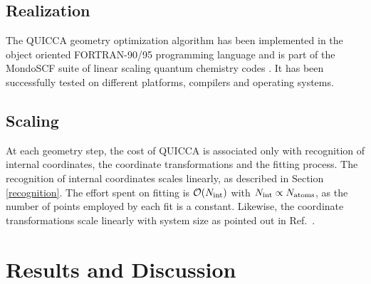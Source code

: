 \documentclass[prl,twocolumn,showpacs,twocolumngrid,superbib]{revtex4}
\begin{document}
\subsection{Realization}

The QUICCA geometry optimization algorithm has been implemented in the
object oriented FORTRAN-90/95 programming language and is part of
the MondoSCF suite of linear scaling quantum chemistry codes \cite{MondoSCF}.
It has been successfully tested on different platforms, compilers and operating
systems. 

\subsection{Scaling}

At each geometry step, the cost of QUICCA is associated only with 
recognition of internal coordinates, the coordinate 
transformations and the fitting process. The recognition of internal 
coordinates scales linearly, as described in Section \ref{recognition}.  
The effort spent on fitting is 
$ {\cal O}(N_{\rm int})$ with $N_{\rm int} \propto N_{\rm atoms}$, as the number of 
points employed by each fit is a constant.  Likewise, the coordinate transformations scale linearly with system 
size as pointed out in Ref.~\cite{nemeth_coordtrf1}.

\section{Results and Discussion} \label{Sresults}
\end{document}
